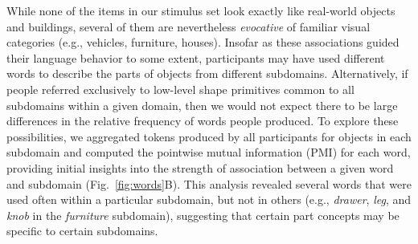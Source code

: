 While none of the items in our stimulus set look exactly like real-world objects and buildings, several of them are nevertheless \textit{evocative} of familiar visual categories (e.g., vehicles, furniture, houses). 
Insofar as these associations guided their language behavior to some extent, participants may have used different words to describe the parts of objects from different subdomains. 
Alternatively, if people referred exclusively to low-level shape primitives common to all subdomains within a given domain, then we would not expect there to be large differences in the relative frequency of words people produced. 
To explore these possibilities, we aggregated tokens produced by all participants for objects in each subdomain and computed the pointwise mutual information (PMI) for each word, providing initial insights into the strength of association between a given word and subdomain (Fig.~\ref{fig:words}B).
This analysis revealed several words that were used often within a particular subdomain, but not in others (e.g., \textit{drawer}, \textit{leg}, and \textit{knob} in the \textit{furniture} subdomain), suggesting that certain part concepts may be specific to certain subdomains.

